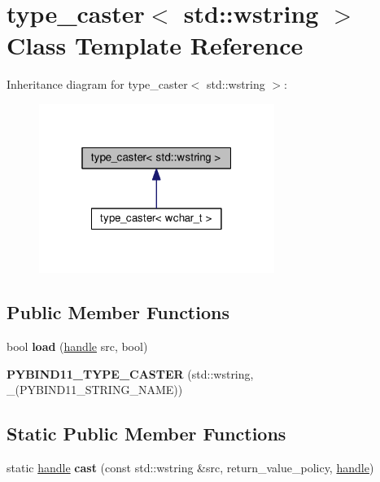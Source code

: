 \hypertarget{classtype__caster_3_01std_1_1wstring_01_4}{}\section{type\+\_\+caster$<$ std\+:\+:wstring $>$ Class Template Reference}
\label{classtype__caster_3_01std_1_1wstring_01_4}


Inheritance diagram for type\+\_\+caster$<$ std\+:\+:wstring $>$\+:
\nopagebreak
\begin{figure}[H]
\begin{center}
\leavevmode
\includegraphics[width=217pt]{classtype__caster_3_01std_1_1wstring_01_4__inherit__graph}
\end{center}
\end{figure}
\subsection*{Public Member Functions}
\begin{DoxyCompactItemize}
\item 
bool {\bfseries load} (\hyperlink{classhandle}{handle} src, bool)\hypertarget{classtype__caster_3_01std_1_1wstring_01_4_a1d363090ee4413ac9f5d92b13c3af528}{}\label{classtype__caster_3_01std_1_1wstring_01_4_a1d363090ee4413ac9f5d92b13c3af528}

\item 
{\bfseries P\+Y\+B\+I\+N\+D11\+\_\+\+T\+Y\+P\+E\+\_\+\+C\+A\+S\+T\+ER} (std\+::wstring, \+\_\+(P\+Y\+B\+I\+N\+D11\+\_\+\+S\+T\+R\+I\+N\+G\+\_\+\+N\+A\+ME))\hypertarget{classtype__caster_3_01std_1_1wstring_01_4_a1fdebc8a8cb39ebacd8a632abb755467}{}\label{classtype__caster_3_01std_1_1wstring_01_4_a1fdebc8a8cb39ebacd8a632abb755467}

\end{DoxyCompactItemize}
\subsection*{Static Public Member Functions}
\begin{DoxyCompactItemize}
\item 
static \hyperlink{classhandle}{handle} {\bfseries cast} (const std\+::wstring \&src, return\+\_\+value\+\_\+policy, \hyperlink{classhandle}{handle})\hypertarget{classtype__caster_3_01std_1_1wstring_01_4_a767b808fc908f2fc8e5c83bf3237b69d}{}\label{classtype__caster_3_01std_1_1wstring_01_4_a767b808fc908f2fc8e5c83bf3237b69d}

\end{DoxyCompactItemize}
